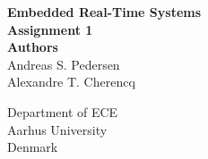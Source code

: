 \documentclass[../main.tex]{subfiles}
\begin{document}
\thispagestyle{empty}

\begin{titlepage}
    \begin{center}
        \vspace*{20pt}
        \textbf{\Huge{Embedded Real-Time Systems}} \\
        \vspace*{20pt}
        \textbf{\large{Assignment 1}} \\
        \vspace*{50pt}
        \textbf{\Large{Authors}} \\
        Andreas S. Pedersen     \\
        Alexandre T. Cherencq   \\
        \vfill

        \vspace{0.8cm}

        \vspace*{1cm}

        Department of ECE\\
        Aarhus University\\
        Denmark
    \end{center}
\end{titlepage}
\end{document}
